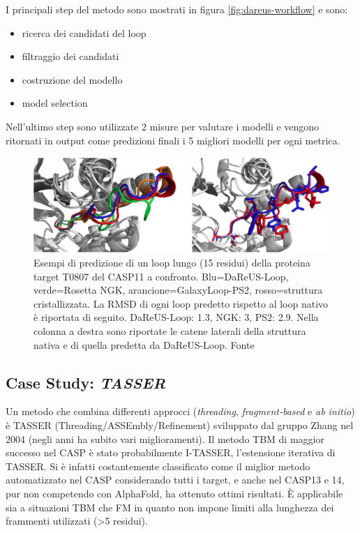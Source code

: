 {{I principali step del metodo sono mostrati in figura \ref{fig:dareus-workflow} e sono:
\begin{itemize}
	\item ricerca dei candidati del loop
	\item filtraggio dei candidati
	\item costruzione del modello
	\item model selection
\end{itemize}

Nell'ultimo step sono utilizzate 2 misure per valutare i modelli e vengono ritornati in output come predizioni finali i 5 migliori modelli per ogni metrica.

\begin{figure}[!htb]
	\centering
	\includegraphics[scale=0.63]{images/dareus-confronto.png}
	\caption{Esempi di predizione di un loop lungo (15 residui) della proteina target T0807 del CASP11 a confronto. Blu=DaReUS-Loop, verde=Rosetta NGK, arancione=GalaxyLoop-PS2, rosso=struttura cristallizzata. La RMSD di ogni loop predetto rispetto al loop nativo è riportata di seguito. DaReUS-Loop: 1.3\angstrom, NGK: 3\angstrom, PS2: 2.9\angstrom. Nella colonna a destra sono riportate le catene laterali della struttura nativa e di quella predetta da DaReUS-Loop. Fonte\cite{karami2018dareus}}
	\label{fig:}
\end{figure}

}

\subsection{Case Study: \textit{TASSER}}

Un metodo che combina differenti approcci (\textit{threading}, \textit{fragment-based} e \textit{ab initio}) è TASSER (Threading/ASSEmbly/Refinement) sviluppato dal gruppo Zhang nel 2004 (negli anni ha subito vari miglioramenti). Il metodo TBM di maggior successo nel CASP è stato probabilmente I-TASSER, l'estensione iterativa di TASSER. Si è infatti costantemente classificato come il miglior metodo automatizzato nel CASP\supercite{pearce2021deep} considerando tutti i target, e anche nel CASP13 e 14, pur non competendo con AlphaFold, ha ottenuto ottimi risultati. È applicabile sia a situazioni TBM che FM in quanto non impone limiti alla lunghezza dei frammenti utilizzati (>5 residui).

}
